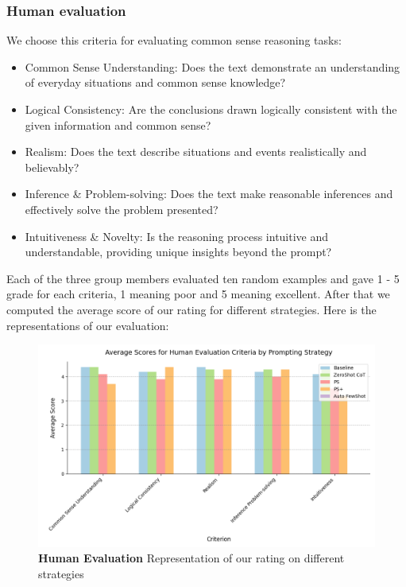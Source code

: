 \documentclass[fleqn,moreauthors,10pt]{ds_report}
\begin{document}
\subsubsection*{Human evaluation}
We choose this criteria for evaluating common sense reasoning tasks:

\begin{itemize}
    \item Common Sense Understanding: Does the text demonstrate an understanding of everyday situations and common sense knowledge?
\end{itemize}

\begin{itemize}
    \item Logical Consistency: Are the conclusions drawn logically consistent with the given information and common sense?
\end{itemize}

\begin{itemize}
    \item Realism: Does the text describe situations and events realistically and believably?
\end{itemize}

\begin{itemize}
    \item Inference & Problem-solving: Does the text make reasonable inferences and effectively solve the problem presented?
\end{itemize}

\begin{itemize}
    \item Intuitiveness & Novelty: Is the reasoning process intuitive and understandable, providing unique insights beyond the prompt?
\end{itemize}

Each of the three group members evaluated ten random examples and gave 1 - 5 grade for each criteria, 1 meaning poor and 5 meaning excellent. After that we computed the average score of our rating for different strategies. Here is the representations of our evaluation:
    \begin{figure}[ht]\centering
    	\includegraphics[width=\linewidth]{report/fig/average_scores_prompting_strategies_minimalistic.png}
    	\caption{\textbf{Human Evaluation} Representation of our rating on different strategies}
    	\label{fig:column}
    \end{figure}
\end{document}
